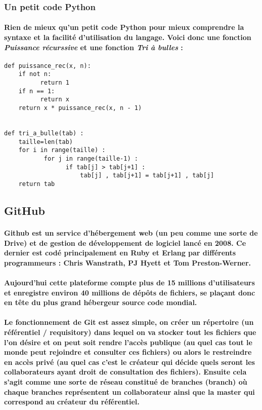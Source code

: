 \documentclass[a4paper, 12pt, twoside]{article}
\begin{document}
\subsubsection{Un petit code Python}
\paragraph{Rien de mieux qu'un petit code Python pour mieux comprendre la syntaxe et la facilité d'utilisation du langage. Voici donc une fonction \textit{Puissance récurssive} et une fonction \textit{Tri à bulles} :}
\begin{verbatim}
def puissance_rec(x, n):
    if not n:
          return 1
    if n == 1:
          return x
    return x * puissance_rec(x, n - 1)
    
    
def tri_a_bulle(tab) :
    taille=len(tab)
    for i in range(taille) :
           for j in range(taille-1) : 
                 if tab[j] > tab[j+1] :
                     tab[j] , tab[j+1] = tab[j+1] , tab[j]
    return tab
\end{verbatim}


\subsection{GitHub}
\paragraph{Github est un service d'hébergement web (un peu comme une sorte de Drive) et de gestion de développement de logiciel lancé en 2008.
Ce dernier est codé principalement en Ruby et Erlang par différents programmeurs : Chris Wanstrath, PJ Hyett et Tom Preston-Werner.}
\paragraph{Aujourd'hui cette plateforme compte plus de 15 millions d'utilisateurs et enregistre environ 40 millions de dépôts de fichiers,
se plaçant donc en tête du plus grand hébergeur source code mondial.}
\paragraph{Le fonctionnement de Git est assez simple, on créer un répertoire (un référentiel / requisitory) dans lequel on va stocker tout les fichiers
que l'on désire et on peut soit rendre l'accès publique (au quel cas tout le monde peut rejoindre et consulter ces fichiers) ou alors le 
restreindre en accès privé (au quel cas c'est le créateur qui décide quels seront les collaborateurs ayant droit de consultation des fichiers).
Ensuite cela s'agit comme une sorte de réseau constitué de branches (branch) où chaque branches représentent un collaborateur ainsi que la 
master qui correspond au créateur du référentiel.}
\end{document}
